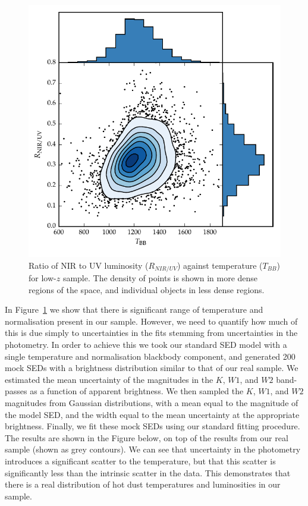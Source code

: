 \begin{figure}
  \centering
  \includegraphics[width=\textwidth]{figures/chapter05/ratio_tbb_density.pdf}
  \caption[{Ratio of NIR to UV luminosity ($R_{NIR/UV}$) against temperature ($T_{BB}$) for low-$z$ sample.}]{Ratio of NIR to UV luminosity ($R_{NIR/UV}$) against temperature ($T_{BB}$) for low-$z$ sample. The density of points is shown in more dense regions of the space, and individual objects in less dense regions. }
  \label{fig:ratio_tbb_density}
\end{figure}

In Figure~\ref{fig:ratio_tbb_density} we show that there is significant range of temperature and normalisation present in our sample. 
However, we need to quantify  how much of this is due simply to uncertainties in the fits stemming from uncertainties in the photometry. 
In order to achieve this we took our standard SED model with a single temperature and normalisation blackbody component, and generated 200 mock SEDs with a brightness distribution similar to that of our real sample. 
We estimated the mean uncertainty of the magnitudes in the $K$, $W1$, and $W2$ band-passes as a function of apparent brightness. 
We then sampled the $K$, $W1$, and $W2$ magnitudes from Gaussian distributions, with a mean equal to the magnitude of the model SED, and the width equal to the mean uncertainty at the appropriate brightness. 
Finally, we fit these mock SEDs using our standard fitting procedure. 
The results are shown in the Figure below, on top of the results from our real sample (shown as grey contours). 
We can see that uncertainty in the photometry introduces a significant scatter to the temperature, but that this scatter is significantly less than the intrinsic scatter in the data. 
This demonstrates that there is a real distribution of hot dust temperatures and luminosities in our sample. 


